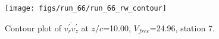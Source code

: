 \begin{figure}[H]
\centering
\texttt{[image: figs/run\_66/run\_66\_rw\_contour]}
\caption{Contour plot of $\overline{v_{r}^{\prime} v_{z}^{\prime}}$ at $z/c$=10.00, $V_{free}$=24.96, station 7.}
\label{fig:run_66_rw_contour}
\end{figure}


